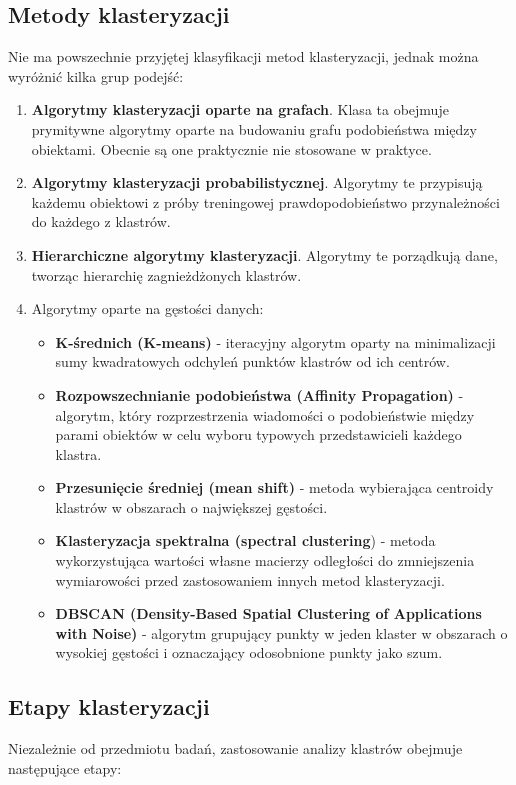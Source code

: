 	
	\subsection{Metody klasteryzacji}
		Nie ma powszechnie przyjętej klasyfikacji metod klasteryzacji, jednak można wyróżnić kilka grup podejść:

		\begin{enumerate}
			\item \textbf{Algorytmy klasteryzacji oparte na grafach}. Klasa ta obejmuje prymitywne algorytmy oparte na budowaniu grafu podobieństwa między obiektami. Obecnie są one praktycznie nie stosowane w praktyce.
			\item \textbf{Algorytmy klasteryzacji probabilistycznej}. Algorytmy te przypisują każdemu obiektowi z próby treningowej prawdopodobieństwo przynależności do każdego z klastrów.
			\item \textbf{Hierarchiczne algorytmy klasteryzacji}. Algorytmy te porządkują dane, tworząc hierarchię zagnieżdżonych klastrów.
			\item Algorytmy oparte na gęstości danych:
			\begin{itemize}
				\item \textbf{K-średnich (K-means)} - iteracyjny algorytm oparty na minimalizacji sumy kwadratowych odchyleń punktów klastrów od ich centrów.
				\item \textbf{Rozpowszechnianie podobieństwa (Affinity Propagation)} - algorytm, który rozprzestrzenia wiadomości o podobieństwie między parami obiektów w celu wyboru typowych przedstawicieli każdego klastra.
				\item \textbf{Przesunięcie średniej (mean shift)} - metoda wybierająca centroidy klastrów w obszarach o największej gęstości.
				\item \textbf{Klasteryzacja spektralna (spectral clustering}) - metoda wykorzystująca wartości własne macierzy odległości do zmniejszenia wymiarowości przed zastosowaniem innych metod klasteryzacji.
				\item \textbf{DBSCAN (Density-Based Spatial Clustering of Applications with Noise)} - algorytm grupujący punkty w jeden klaster w obszarach o wysokiej gęstości i oznaczający odosobnione punkty jako szum.
			\end{itemize}
		\end{enumerate}

		\subsection{Etapy klasteryzacji}
			Niezależnie od przedmiotu badań, zastosowanie analizy klastrów obejmuje następujące etapy:
			
